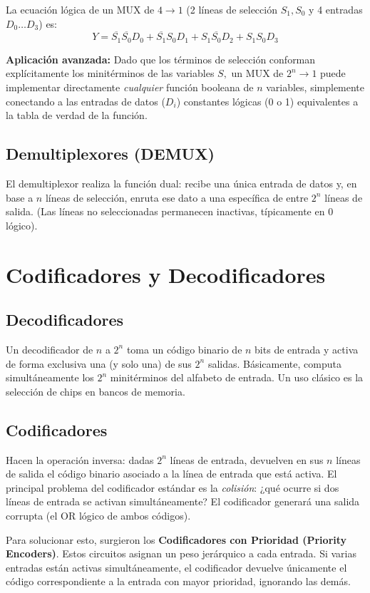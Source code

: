 La ecuación lógica de un MUX de $4 \to 1$ (2 líneas de selección $S_1, S_0$ y 4 entradas $D_0 \dots D_3$) es:
\[ Y = \overline{S_1}\overline{S_0}D_0 + \overline{S_1}S_0D_1 + S_1\overline{S_0}D_2 + S_1S_0D_3 \]

\textbf{Aplicación avanzada:} Dado que los términos de selección conforman explícitamente los minitérminos de las variables $S,$ un MUX de $2^n \to 1$ puede implementar directamente \textit{cualquier} función booleana de $n$ variables, simplemente conectando a las entradas de datos ($D_i$) constantes lógicas (0 o 1) equivalentes a la tabla de verdad de la función.

\subsection{Demultiplexores (DEMUX)}
El demultiplexor realiza la función dual: recibe una única entrada de datos y, en base a $n$ líneas de selección, enruta ese dato a una específica de entre $2^n$ líneas de salida. (Las líneas no seleccionadas permanecen inactivas, típicamente en 0 lógico).

\section{Codificadores y Decodificadores}

\subsection{Decodificadores}
Un decodificador de $n$ a $2^n$ toma un código binario de $n$ bits de entrada y activa de forma exclusiva una (y solo una) de sus $2^n$ salidas. Básicamente, computa simultáneamente los $2^n$ minitérminos del alfabeto de entrada. Un uso clásico es la selección de chips en bancos de memoria.

\subsection{Codificadores}
Hacen la operación inversa: dadas $2^n$ líneas de entrada, devuelven en sus $n$ líneas de salida el código binario asociado a la línea de entrada que está activa.
El principal problema del codificador estándar es la \textit{colisión}: ¿qué ocurre si dos líneas de entrada se activan simultáneamente? El codificador generará una salida corrupta (el OR lógico de ambos códigos).

Para solucionar esto, surgieron los \textbf{Codificadores con Prioridad (Priority Encoders)}. Estos circuitos asignan un peso jerárquico a cada entrada. Si varias entradas están activas simultáneamente, el codificador devuelve únicamente el código correspondiente a la entrada con mayor prioridad, ignorando las demás.

